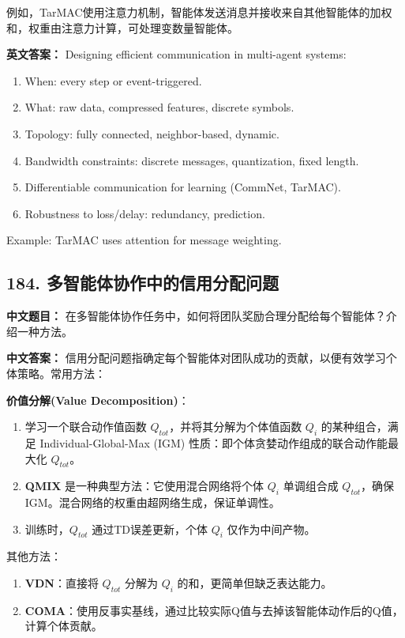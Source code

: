 \documentclass[10pt,a4paper]{ctexart}
\begin{document}
例如，TarMAC使用注意力机制，智能体发送消息并接收来自其他智能体的加权和，权重由注意力计算，可处理变数量智能体。

\textbf{英文答案：}  
Designing efficient communication in multi-agent systems:

\begin{enumerate}
    \item When: every step or event-triggered.
    \item What: raw data, compressed features, discrete symbols.
    \item Topology: fully connected, neighbor-based, dynamic.
    \item Bandwidth constraints: discrete messages, quantization, fixed length.
    \item Differentiable communication for learning (CommNet, TarMAC).
    \item Robustness to loss/delay: redundancy, prediction.
\end{enumerate}

Example: TarMAC uses attention for message weighting.

\subsection*{184. 多智能体协作中的信用分配问题}
\textbf{中文题目：} 在多智能体协作任务中，如何将团队奖励合理分配给每个智能体？介绍一种方法。

\textbf{中文答案：}  
信用分配问题指确定每个智能体对团队成功的贡献，以便有效学习个体策略。常用方法：

\textbf{价值分解(Value Decomposition)}：
\begin{enumerate}
    \item 学习一个联合动作值函数 $Q_{tot}$，并将其分解为个体值函数 $Q_i$ 的某种组合，满足 Individual-Global-Max (IGM) 性质：即个体贪婪动作组成的联合动作能最大化 $Q_{tot}$。
    \item \textbf{QMIX} 是一种典型方法：它使用混合网络将个体 $Q_i$ 单调组合成 $Q_{tot}$，确保 IGM。混合网络的权重由超网络生成，保证单调性。
    \item 训练时，$Q_{tot}$ 通过TD误差更新，个体 $Q_i$ 仅作为中间产物。
\end{enumerate}

其他方法：
\begin{enumerate}
    \item \textbf{\textbf{VDN}}：直接将 $Q_{tot}$ 分解为 $Q_i$ 的和，更简单但缺乏表达能力。
    \item \textbf{\textbf{COMA}}：使用反事实基线，通过比较实际Q值与去掉该智能体动作后的Q值，计算个体贡献。
\end{enumerate}
\end{document}
